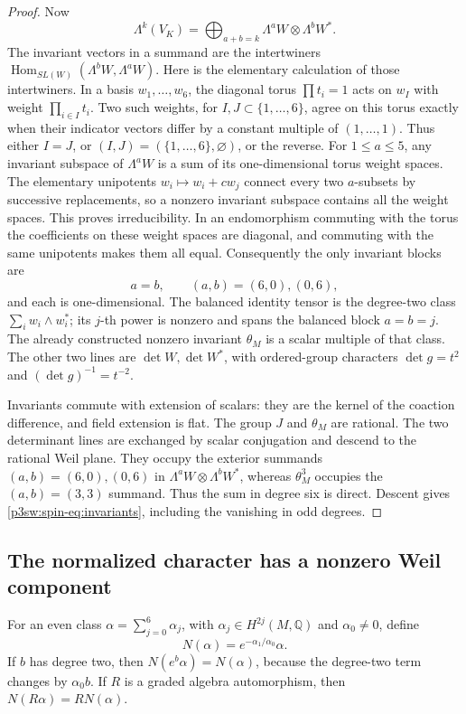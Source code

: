 \documentclass[11pt]{article}
\newcommand{\Q}{\mathbb Q}
\numberwithin{equation}{section}
\begin{document}
\begin{proof}
Now
\[
 \Lambda^k(V_K)
   =\bigoplus_{a+b=k}\Lambda^aW\otimes\Lambda^bW^*.
\]
The invariant vectors in a summand are the intertwiners
\(\operatorname{Hom}_{SL(W)}(\Lambda^bW,\Lambda^aW)\).
Here is the elementary calculation of those intertwiners.  In a
basis \(w_1,\ldots,w_6\), the diagonal torus
\(\prod t_i=1\) acts on \(w_I\) with weight \(\prod_{i\in I}t_i\).
Two such weights, for \(I,J\subset\{1,\ldots,6\}\), agree on this
torus exactly when their indicator vectors differ by a constant
multiple of \((1,\ldots,1)\).  Thus either \(I=J\), or
\((I,J)=(\{1,\ldots,6\},\varnothing)\), or the reverse.
For \(1\leq a\leq5\), any invariant subspace of \(\Lambda^aW\)
is a sum of its one-dimensional torus weight spaces.  The elementary
unipotents \(w_i\mapsto w_i+c w_j\) connect every two \(a\)-subsets
by successive replacements, so a nonzero invariant subspace contains
all the weight spaces.  This proves irreducibility.  In an endomorphism
commuting with the torus the coefficients on these weight spaces
are diagonal, and commuting with the same unipotents makes them all
equal.  Consequently the only invariant blocks are
\[
 a=b,\qquad (a,b)=(6,0),(0,6),
\]
and each is one-dimensional.  The balanced identity tensor is the
degree-two class \(\sum_i w_i\wedge w_i^*\); its \(j\)-th power is
nonzero and spans the balanced block \(a=b=j\).  The already
constructed nonzero invariant \(\theta_M\) is a scalar multiple of
that class.  The other two lines are \(\det W,\det W^*\), with
ordered-group characters \(\det g=t^2\) and \((\det g)^{-1}=t^{-2}\).

Invariants commute with extension of scalars: they are the kernel of
the coaction difference, and field extension is flat.  The group
\(J\) and \(\theta_M\) are rational.  The two determinant lines are
exchanged by scalar conjugation and descend to the rational Weil
plane.  They occupy the exterior summands
\((a,b)=(6,0),(0,6)\) in \(\Lambda^aW\otimes\Lambda^bW^*\),
whereas \(\theta_M^3\) occupies the \((a,b)=(3,3)\) summand.
Thus the sum in degree six is direct.  Descent gives
\eqref{p3sw:spin-eq:invariants}, including the vanishing in odd
degrees.
\end{proof}

\subsection{The normalized character has a nonzero Weil component}

For an even class \(\alpha=\sum_{j=0}^6\alpha_j\), with
\(\alpha_j\in H^{2j}(M,\Q)\) and \(\alpha_0\ne0\), define
\[
 N(\alpha)=e^{-\alpha_1/\alpha_0}\alpha .
\]
If \(b\) has degree two, then \(N(e^b\alpha)=N(\alpha)\), because
the degree-two term changes by \(\alpha_0b\).  If \(R\) is a graded
algebra automorphism, then \(N(R\alpha)=RN(\alpha)\).
\end{document}
